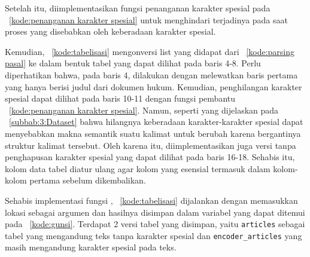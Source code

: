 Setelah itu, diimplementasikan fungsi penanganan karakter spesial pada \kode{}~\ref{kode:penanganan karakter spesial} untuk menghindari terjadinya \error{} pada saat proses \retrieval{} yang disebabkan oleh keberadaan karakter spesial.


Kemudian, \kode{}~\ref{kode:tabelisasi} mengonversi list yang didapat dari \kode{}~\ref{kode:parsing pasal} ke dalam bentuk tabel yang dapat dilihat pada baris 4-8. Perlu diperhatikan bahwa, pada baris 4, \parsing{} dilakukan dengan melewatkan baris pertama yang hanya berisi judul dari dokumen hukum. Kemudian, penghilangan karakter spesial dapat dilihat pada baris 10-11 dengan fungsi pembantu \kode{}~\ref{kode:penanganan karakter spesial}. Namun, seperti yang dijelaskan pada \subbab{}~\ref{subbab:3:Dataset} bahwa hilangnya keberadaan karakter-karakter spesial dapat menyebabkan makna semantik suatu kalimat untuk berubah karena bergantinya struktur kalimat tersebut. Oleh karena itu, diimplementasikan juga versi tanpa penghapusan karakter spesial yang dapat dilihat pada baris 16-18. Sehabis itu, kolom data tabel diatur ulang agar kolom yang esensial termasuk dalam kolom-kolom pertama sebelum dikembalikan.


Sehabis implementasi fungsi \parsing{}, \kode{}~\ref{kode:tabelisasi} dijalankan dengan memasukkan lokasi \txt{} \file{} sebagai argumen dan hasilnya disimpan dalam variabel yang dapat ditemui pada \kode{}~\ref{kode:gunsi}. Terdapat 2 versi tabel yang disimpan, yaitu \lstinline{articles} sebagai tabel yang mengandung teks tanpa karakter spesial dan \lstinline{encoder_articles} yang masih mengandung karakter spesial pada teks.


